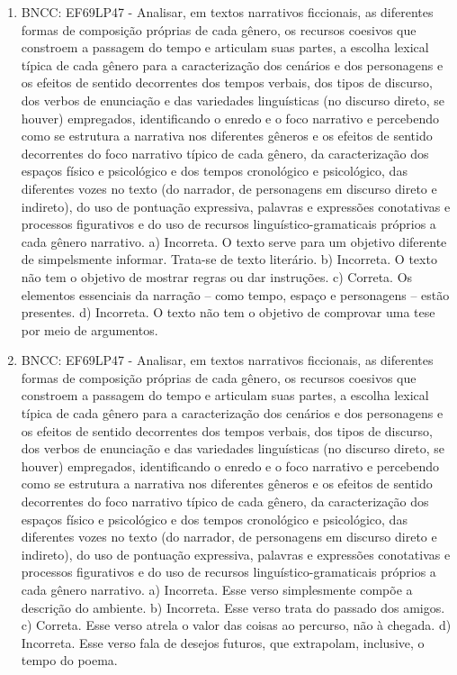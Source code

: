 \begin{enumerate}
\item
BNCC: EF69LP47 - Analisar, em textos narrativos ficcionais, as
diferentes formas de composição próprias de cada gênero, os recursos
coesivos que constroem a passagem do tempo e articulam suas partes, a
escolha lexical típica de cada gênero para a caracterização dos cenários
e dos personagens e os efeitos de sentido decorrentes dos tempos
verbais, dos tipos de discurso, dos verbos de enunciação e das
variedades linguísticas (no discurso direto, se houver) empregados,
identificando o enredo e o foco narrativo e percebendo como se estrutura
a narrativa nos diferentes gêneros e os efeitos de sentido decorrentes
do foco narrativo típico de cada gênero, da caracterização dos espaços
físico e psicológico e dos tempos cronológico e psicológico, das
diferentes vozes no texto (do narrador, de personagens em discurso
direto e indireto), do uso de pontuação expressiva, palavras e
expressões conotativas e processos figurativos e do uso de recursos
linguístico-gramaticais próprios a cada gênero narrativo.
a) Incorreta. O texto serve para um objetivo diferente de simpelsmente
informar. Trata-se de texto literário. b) Incorreta. O texto não tem o
objetivo de mostrar regras ou dar instruções. c) Correta. Os elementos
essenciais da narração -- como tempo, espaço e personagens -- estão
presentes. d) Incorreta. O texto não tem o objetivo de comprovar uma
tese por meio de argumentos.

\item
BNCC: EF69LP47 - Analisar, em textos narrativos ficcionais, as
diferentes formas de composição próprias de cada gênero, os recursos
coesivos que constroem a passagem do tempo e articulam suas partes, a
escolha lexical típica de cada gênero para a caracterização dos cenários
e dos personagens e os efeitos de sentido decorrentes dos tempos
verbais, dos tipos de discurso, dos verbos de enunciação e das
variedades linguísticas (no discurso direto, se houver) empregados,
identificando o enredo e o foco narrativo e percebendo como se estrutura
a narrativa nos diferentes gêneros e os efeitos de sentido decorrentes
do foco narrativo típico de cada gênero, da caracterização dos espaços
físico e psicológico e dos tempos cronológico e psicológico, das
diferentes vozes no texto (do narrador, de personagens em discurso
direto e indireto), do uso de pontuação expressiva, palavras e
expressões conotativas e processos figurativos e do uso de recursos
linguístico-gramaticais próprios a cada gênero narrativo.
a) Incorreta. Esse verso simplesmente compõe a descrição do ambiente. b)
Incorreta. Esse verso trata do passado dos amigos. c) Correta. Esse
verso atrela o valor das coisas ao percurso, não à chegada. d)
Incorreta. Esse verso fala de desejos futuros, que extrapolam,
inclusive, o tempo do poema.


\end{enumerate}
